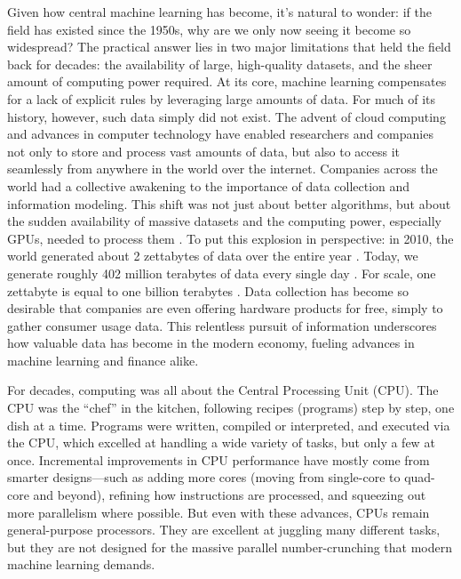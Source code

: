 Given how central machine learning has become, it's natural to wonder: if the field has existed since the 1950s, why are we only now seeing it become so widespread?
The practical answer lies in two major limitations that held the field back for decades: the availability of large, high-quality datasets, and the sheer amount of computing power required. At its core, machine learning compensates for a lack of explicit rules by leveraging large amounts of data. For much of its history, however, such data simply did not exist. The advent of cloud computing and advances in computer technology have enabled researchers and companies not only to store and process vast amounts of data, but also to access it seamlessly from anywhere in the world over the internet. Companies across the world had a collective awakening to the importance of data collection and information modeling. This shift was not just about better algorithms, but about the sudden availability of massive datasets and the computing power, especially GPUs, needed to process them \cite{ibm2012bigdata,idc2021datasphere}.
To put this explosion in perspective: in 2010, the world generated about 2 zettabytes of data over the entire year \cite{statista2024data,idc2021datasphere}. Today, we generate roughly 402 million terabytes of data every single day \cite{statista2024data}. For scale, one zettabyte is equal to one billion terabytes \cite{nistZB}.
Data collection has become so desirable that companies are even offering hardware products for free, simply to gather consumer usage data. This relentless pursuit of information underscores how valuable data has become in the modern economy, fueling advances in machine learning and finance alike.

For decades, computing was all about the Central Processing Unit (CPU). 
The CPU was the ``chef'' in the kitchen, following recipes (programs) step by step, one dish at a time.
Programs were written, compiled or interpreted, and executed via the CPU, which excelled at handling a wide variety of tasks, but only a few at once.
Incremental improvements in CPU performance have mostly come from smarter designs---such as adding more cores (moving from single-core to quad-core and beyond), refining how instructions are processed, and squeezing out more parallelism where possible. 
But even with these advances, CPUs remain general-purpose processors. They are excellent at juggling many different tasks, but they are not designed for the massive parallel number-crunching that modern machine learning demands.

